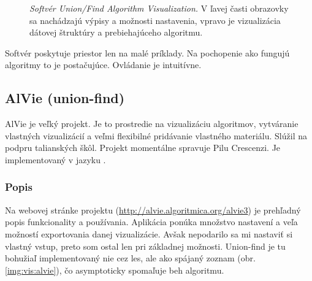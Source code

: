 \begin{figure}
\centering
{}
\caption{\emph{Softvér Union/Find Algorithm Visualization.} V ľavej časti 
obrazovky sa nachádzajú výpisy a možnosti nastavenia, vpravo je vizualizácia 
dátovej štruktúry a prebiehajúceho algoritmu.}
\label{img:vis:ufav}
\end{figure}

Softvér poskytuje priestor len na malé príklady. Na 
pochopenie ako fungujú algoritmy to je postačujúce. Ovládanie je intuitívne.

\subsection{AlVie (union-find)}\label{sec:alvie}

AlVie je veľký projekt. Je to prostredie na vizualizáciu algoritmov, 
vytváranie vlastných vizualizácií a veľmi flexibilné pridávanie vlastného 
materiálu. Slúžil na podpru talianských škôl. Projekt momentálne spravuje 
Pilu Crescenzi. Je implementovaný v jazyku \Java.

\subsubsection{Popis}
Na webovej stránke projektu (\url{http://alvie.algoritmica.org/alvie3}) je 
prehľadný popis funkcionality a používania. Aplikácia ponúka množstvo 
nastavení a veľa možností exportovania danej vizualizácie. Avšak nepodarilo sa 
mi nastaviť si vlastný vstup, preto som ostal len pri základnej možnosti. 
Union-find je tu bohužiaľ implementovaný nie cez les, ale ako spájaný zoznam 
(obr. \ref{img:vis:alvie}), čo asymptoticky spomaľuje beh algoritmu.

